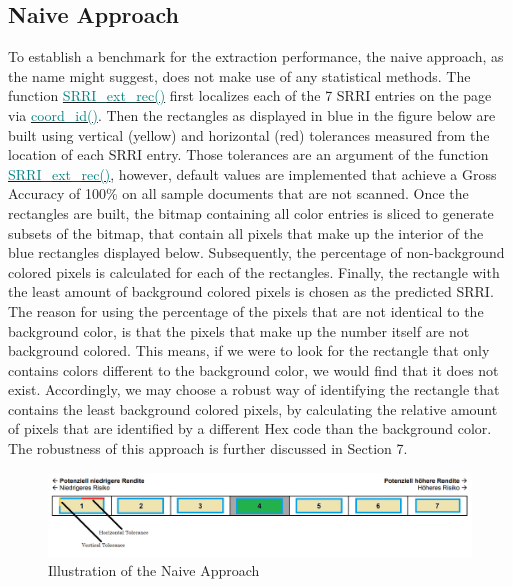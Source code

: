 \documentclass[aodsor,preprint]{imsart}
\numberwithin{equation}{section}
\theoremstyle{plain}
\begin{document}
\subsection{Naive Approach}
To establish a benchmark for the extraction performance, the naive approach, as the name might suggest, does not make use of any statistical methods. The function \href{https://github.com/Base-R-Best-R/KID/blob/main/Code/Package/KIDs/R/SRRI_ext_rec.R}{\textcolor{teal}{SRRI\_ext\_rec()}} first localizes each of the 7 SRRI entries on the page via \href{https://github.com/Base-R-Best-R/KID/blob/main/Code/Package/KIDs/R/coord_id.R}{\textcolor{teal}{coord\_id()}}. Then the rectangles as displayed in blue in the figure below are built using vertical (yellow) and horizontal (red) tolerances measured from the location of each SRRI entry. Those tolerances are an argument of the function \href{https://github.com/Base-R-Best-R/KID/blob/main/Code/Package/KIDs/R/SRRI_ext_rec.R}{\textcolor{teal}{SRRI\_ext\_rec()}}, however, default values are implemented that achieve a Gross Accuracy of 100\% on all sample documents that are not scanned. Once the rectangles are built, the bitmap containing all color entries is sliced to generate subsets of the bitmap, that contain all pixels that make up the interior of the blue rectangles displayed below. Subsequently, the percentage of non-background colored pixels is calculated for each of the rectangles. Finally, the rectangle with the least amount of background colored pixels is chosen as the predicted SRRI. The reason for using the percentage of the pixels that are not identical to the background color, is that the pixels that make up the number itself are not background colored. This means, if we were to look for the rectangle that only contains colors different to the background color, we would find that it does not exist. Accordingly, we may choose a robust way of identifying the rectangle that contains the least background colored pixels, by calculating the relative amount of pixels that are identified by a different Hex code than the background color. The robustness of this approach is further discussed in Section 7.

\begin{figure}[H]
	\includegraphics[width = 12cm]{example_SRRI_graph_naive}
	\caption{Illustration of the Naive Approach}
\end{figure}
\newpage
\end{document}

